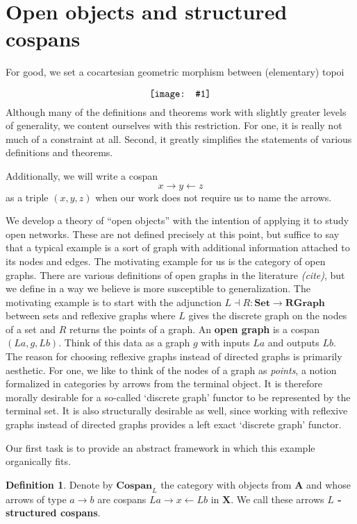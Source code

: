 \documentclass{amsart}
\newcommand{\Set}{\cat{Set}}
\newcommand{\RGraph}{\cat{RGraph}}
\newcommand{\A}{\cat{A}}
\newcommand{\X}{\cat{X}}
\newcommand{\defn}[1]{\textbf{#1}}
\newcommand{\cat}[1]{\mathbf{#1}}
\newcommand{\from}{\colon}
\newcommand{\diagram}[1]{\raisebox{-0.5\height}{\texttt{[image: \#1]}}}
\newcommand{\Cospan}{\mathbf{Cospan}}
\theoremstyle{remark}
\theoremstyle{definition}
\newtheorem{definition}[theorem]{Definition}
\begin{document}
\section{Open objects and structured cospans}
\label{sec:open-objects}

For good, we set a cocartesian geometric morphism between (elementary)
topoi
  \[
    \diagram{diag_oo_geometric-morphism}
  \]
Although many of the definitions and theorems work with slightly
greater levels of generality, we content ourselves with this
restriction. For one, it is really not much of a constraint at
all. Second, it greatly simplifies the statements of various
definitions and theorems.
  
Additionally, we will write a cospan
\[
    x \to y \gets z
\]
as a triple \( (x,y,z) \) when our work does not require us to name
the arrows.
  
We develop a theory of ``open objects'' with the intention of applying
it to study open networks.  These are not defined precisely at this
point, but suffice to say that a typical example is a sort of graph
with additional information attached to its nodes and edges.  The
motivating example for us is the category of open graphs.  There are
various definitions of open graphs in the literature \emph{(cite)},
but we define in a way we believe is more susceptible to
generalization.  The motivating example is to start with the
adjunction $ L \dashv R \from \Set \to \RGraph $ between sets and
reflexive graphs where $ L $ gives the discrete graph on the nodes of
a set and $ R $ returns the points of a graph.  An \defn{open graph}
is a cospan $ ( La , g , Lb ) $.  Think of this data as a graph $ g $
with inputs $ La $ and outputs $ Lb $.  The reason for choosing
reflexive graphs instead of directed graphs is primarily aesthetic.
For one, we like to think of the nodes of a graph as \emph{points}, a
notion formalized in categories by arrows from the terminal object.
It is therefore morally desirable for a so-called `discrete graph'
functor to be represented by the terminal set. It is also structurally
desirable as well, since working with reflexive graphs instead of
directed graphs provides a left exact `discrete graph' functor.
 
Our first task is to provide an abstract framework in which this
example organically fits.

\begin{definition} \label{df:struct-cospan}
  Denote by \( \Cospan_L \) the category with objects from \( \A \)
  and whose arrows of type \( a \to b \) are cospans \( La \to x \gets
  Lb \) in \( \X \). We call these arrows \defn{ \( L \) -structured
    cospans}.
\end{definition}
\end{document}
